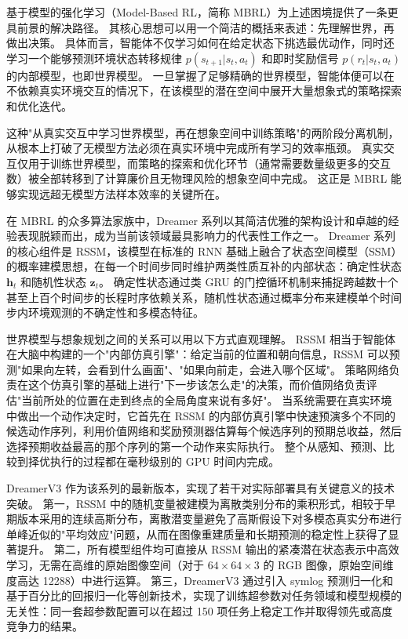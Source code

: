 \documentclass[12pt,a4paper]{ctexart}
\begin{document}
基于模型的强化学习（Model-Based RL，简称 MBRL）为上述困境提供了一条更具前景的解决路径。
其核心思想可以用一个简洁的概括来表述：先理解世界，再做出决策。
具体而言，智能体不仅学习如何在给定状态下挑选最优动作，同时还学习一个能够预测环境状态转移规律 $p(s_{t+1}|s_t,a_t)$ 和即时奖励信号 $p(r_t|s_t,a_t)$ 的内部模型，也即世界模型。
一旦掌握了足够精确的世界模型，智能体便可以在不依赖真实环境交互的情况下，在该模型的潜在空间中展开大量想象式的策略探索和优化迭代。

这种"从真实交互中学习世界模型，再在想象空间中训练策略"的两阶段分离机制，从根本上打破了无模型方法必须在真实环境中完成所有学习的效率瓶颈。
真实交互仅用于训练世界模型，而策略的探索和优化环节（通常需要数量级更多的交互数）被全部转移到了计算廉价且无物理风险的想象空间中完成。
这正是 MBRL 能够实现远超无模型方法样本效率的关键所在。

在 MBRL 的众多算法家族中，Dreamer 系列以其简洁优雅的架构设计和卓越的经验表现脱颖而出，成为当前该领域最具影响力的代表性工作之一。
Dreamer 系列的核心组件是 RSSM，该模型在标准的 RNN 基础上融合了状态空间模型（SSM）的概率建模思想，在每一个时间步同时维护两类性质互补的内部状态：确定性状态 $\mathbf{h}_t$ 和随机性状态 $\mathbf{z}_t$。
确定性状态通过类 GRU 的门控循环机制来捕捉跨越数十个甚至上百个时间步的长程时序依赖关系，随机性状态通过概率分布来建模单个时间步内环境观测的不确定性和多模态特征。

世界模型与想象规划之间的关系可以用以下方式直观理解。
RSSM 相当于智能体在大脑中构建的一个"内部仿真引擎"：给定当前的位置和朝向信息，RSSM 可以预测"如果向左转，会看到什么画面"、"如果向前走，会进入哪个区域"。
策略网络负责在这个仿真引擎的基础上进行"下一步该怎么走"的决策，而价值网络负责评估"当前所处的位置在走到终点的全局角度来说有多好"。
当系统需要在真实环境中做出一个动作决定时，它首先在 RSSM 的内部仿真引擎中快速预演多个不同的候选动作序列，利用价值网络和奖励预测器估算每个候选序列的预期总收益，然后选择预期收益最高的那个序列的第一个动作来实际执行。
整个从感知、预测、比较到择优执行的过程都在毫秒级别的 GPU 时间内完成。

DreamerV3\cite{hafner2023mastering} 作为该系列的最新版本，实现了若干对实际部署具有关键意义的技术突破。
第一，RSSM 中的随机变量被建模为离散类别分布的乘积形式，相较于早期版本采用的连续高斯分布，离散潜变量避免了高斯假设下对多模态真实分布进行单峰近似的"平均效应"问题，从而在图像重建质量和长期预测的稳定性上获得了显著提升。
第二，所有模型组件均可直接从 RSSM 输出的紧凑潜在状态表示中高效学习，无需在高维的原始图像空间（对于 $64\times64\times3$ 的 RGB 图像，原始空间维度高达 12288）中进行运算。
第三，DreamerV3 通过引入 symlog 预测归一化和基于百分比的回报归一化等创新技术，实现了训练超参数对任务领域和模型规模的无关性：同一套超参数配置可以在超过 150 项任务上稳定工作并取得领先或高度竞争力的结果。
\end{document}
